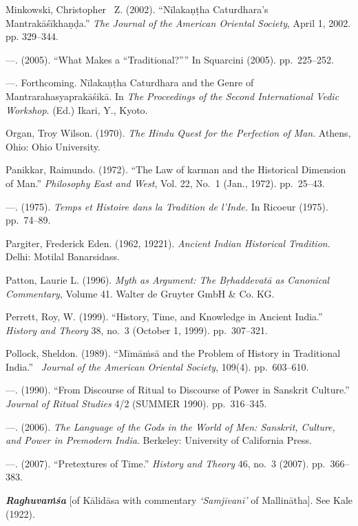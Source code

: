 \begin{thebibliography}{99}
  Minkowski, Christopher  Z. (2002). “Nīlakaṇṭha Caturdhara's Mantrakāśīkhaṇḍa.” \textit{The Journal of the American Oriental Society}, April 1, 2002. pp. 329–344.

  —. (2005). “What Makes a “Traditional?”” In Squarcini (2005). pp.~225–252.

  —. Forthcoming. Nīlakaṇṭha Caturdhara and the Genre of Mantrarahasyaprakāśikā. In \textit{The Proceedings of the Second International Vedic Workshop}. (Ed.) Ikari, Y., Kyoto.

  Organ, Troy Wilson. (1970). \textit{The Hindu Quest for the Perfection of Man}. Athens, Ohio: Ohio University.

  Panikkar, Raimundo. (1972). “The Law of karman and the Historical Dimension of Man.” \textit{Philosophy East and West}, Vol. 22, No.~1 (Jan., 1972). pp.~25–43.

  —. (1975). \textit{Temps et Histoire dans la Tradition de l’Inde.} In Ricoeur (1975). pp.~74–89.

  Pargiter, Frederick Eden. (1962, 19221). \textit{Ancient Indian Historical Tradition}. Delhi: Motilal Banarsidass.

  Patton, Laurie L. (1996). \textit{Myth as Argument: The Bṛhaddevatā as Canonical Commentary}, Volume 41. Walter de Gruyter GmbH \& Co. KG.

  Perrett, Roy, W. (1999). “History, Time, and Knowledge in Ancient India.” \textit{History and Theory} 38, no.~3 (October 1, 1999). pp.~307–321.

  Pollock, Sheldon. (1989). “Mīmāṁsā and the Problem of History in Traditional India.”  \textit{Journal of the American Oriental Society}, 109(4). pp.~603–610.

  —. (1990). “From Discourse of Ritual to Discourse of Power in Sanskrit Culture.” \textit{Journal of Ritual Studies} 4/2 (SUMMER 1990). pp.~316–345.

  —. (2006). \textit{The Language of the Gods in the World of Men: Sanskrit, Culture, and Power in Premodern India}. Berkeley: University of California Press.

  —. (2007). “Pretextures of Time.” \textit{History and Theory} 46, no.~3 (2007). pp.~366–383.

  \textbf{\textit{Raghuvaṁśa}} [of Kālidāsa with commentary \textit{‘Samjīvanī’} of Mallinātha]. See Kale (1922).


\end{thebibliography}
